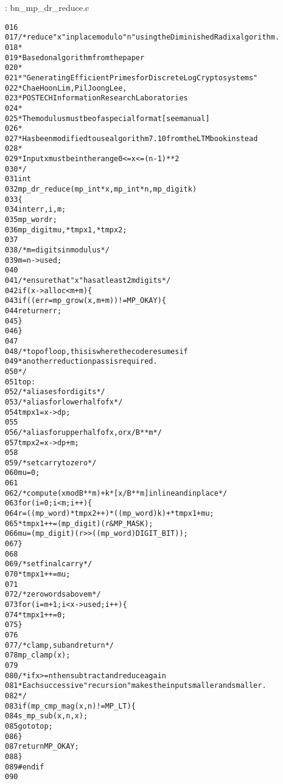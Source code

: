 \documentclass[b5paper]{book}
\begin{document}
\vspace{+3mm}\begin{small}
\hspace{-5.1mm}{\bf File}: bn\_mp\_dr\_reduce.c
\vspace{-3mm}
\begin{alltt}
016   
017   /* reduce "x" in place modulo "n" using the Diminished Radix algorithm.
018    *
019    * Based on algorithm from the paper
020    *
021    * "Generating Efficient Primes for Discrete Log Cryptosystems"
022    *                 Chae Hoon Lim, Pil Joong Lee,
023    *          POSTECH Information Research Laboratories
024    *
025    * The modulus must be of a special format [see manual]
026    *
027    * Has been modified to use algorithm 7.10 from the LTM book instead
028    *
029    * Input x must be in the range 0 <= x <= (n-1)**2
030    */
031   int
032   mp_dr_reduce (mp_int * x, mp_int * n, mp_digit k)
033   \{
034     int      err, i, m;
035     mp_word  r;
036     mp_digit mu, *tmpx1, *tmpx2;
037   
038     /* m = digits in modulus */
039     m = n->used;
040   
041     /* ensure that "x" has at least 2m digits */
042     if (x->alloc < m + m) \{
043       if ((err = mp_grow (x, m + m)) != MP_OKAY) \{
044         return err;
045       \}
046     \}
047   
048   /* top of loop, this is where the code resumes if
049    * another reduction pass is required.
050    */
051   top:
052     /* aliases for digits */
053     /* alias for lower half of x */
054     tmpx1 = x->dp;
055   
056     /* alias for upper half of x, or x/B**m */
057     tmpx2 = x->dp + m;
058   
059     /* set carry to zero */
060     mu = 0;
061   
062     /* compute (x mod B**m) + k * [x/B**m] inline and inplace */
063     for (i = 0; i < m; i++) \{
064         r         = ((mp_word)*tmpx2++) * ((mp_word)k) + *tmpx1 + mu;
065         *tmpx1++  = (mp_digit)(r & MP_MASK);
066         mu        = (mp_digit)(r >> ((mp_word)DIGIT_BIT));
067     \}
068   
069     /* set final carry */
070     *tmpx1++ = mu;
071   
072     /* zero words above m */
073     for (i = m + 1; i < x->used; i++) \{
074         *tmpx1++ = 0;
075     \}
076   
077     /* clamp, sub and return */
078     mp_clamp (x);
079   
080     /* if x >= n then subtract and reduce again
081      * Each successive "recursion" makes the input smaller and smaller.
082      */
083     if (mp_cmp_mag (x, n) != MP_LT) \{
084       s_mp_sub(x, n, x);
085       goto top;
086     \}
087     return MP_OKAY;
088   \}
089   #endif
090   
\end{alltt}
\end{small}
\end{document}
